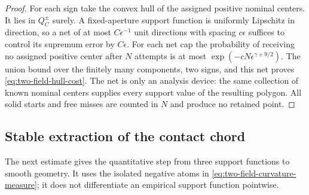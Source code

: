 \begin{proof}
For each sign take the convex hull of the assigned positive nominal
centers.  It lies in $Q_C^\pm$ surely.  A fixed-aperture support
function is uniformly Lipschitz in direction, so a net of at most
$C\epsilon^{-1}$ unit directions with spacing $c\epsilon$ suffices
to control its supremum error by $C\epsilon$.  For each net cap the
probability of receiving no assigned positive center after $N$ attempts
is at most $\exp(-cN\epsilon^{\gamma+9/2})$.  The union bound over
the finitely many components, two signs, and this net proves
\eqref{eq:two-field-hull-cost}.  The net is only an analysis device:
the same collection of known nominal centers supplies every support
value of the resulting polygon.  All solid starts and free misses
are counted in $N$ and produce no retained point.
\end{proof}

\subsection{Stable extraction of the contact chord}
The next estimate gives the quantitative step from three support
functions to smooth geometry.  It uses the isolated negative atoms in
\eqref{eq:two-field-curvature-measure}; it does not differentiate an
empirical support function pointwise.


